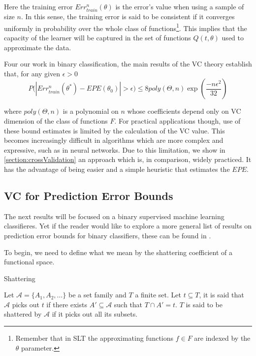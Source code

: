 Here the training error $Err^{n}_{train}(\theta)$ is the error's value when using a sample of size $n$.
In this sense, the training error is said to be consistent if it converges uniformly in probability over the whole class of functions\footnote{Remember that in SLT the approximating functions $f \in F$ are indexed by the $\theta$ parameter.}.
This implies that the capacity of the learner will be captured in the set of functions $Q(t,\theta)$ used to approximate the data.


    Four our work in binary classification, the main results of the VC theory establish that, for any given $\epsilon > 0$
\begin{equation}
P\Bigg(  \left|  Err^n_{train}(\theta^*) - EPE(\theta_0) \right| > \epsilon \Bigg)  \leq 8 poly(\Theta,n) \exp{ \left( {\frac{-n\epsilon^2}{32}} \right)  }
\end{equation}\label{eq:vapnik-binaryBoundProbability}

where $poly(\Theta,n)$ is a polynomial on $n$ whose coefficients depend only on VC dimension of the class of functions $F$.
For practical applications though, use of these bound estimates is limited by the calculation of the VC value.
This becomes increasingly difficult in algorithms which are more complex and expressive, such as in neural networks.
Due to this limitation, we show in \cref{section:crossValidation} an approach which is, in comparison, widely practiced.
It has the advantage of being easier and a simple heuristic that estimates the $EPE$.

\subsection{VC for Prediction Error Bounds }\label{appx:sec:vcErrroBounds}

The next results will be focused on a binary supervised machine learning classifieres. Yet if the reader would like to explore a more general list of results on prediction error bounds for binary classifiers, these can be found in \citep{cherkassky-learning2007}.

To begin, we need to define what we mean by the shattering coefficient of a functional space.

\begin{definition}{Shattering}

Let $\mathcal {A}= \{A_1,A_{2},\dots \}$ be a set family and $T$ a finite set.
Let $t \subseteq T$, it is said that $\mathcal {A}$ picks out $t$ if there exists $A' \subseteq \mathcal {A} $ such that $ T \cap A' = t$.
$T$ is said to be shattered by $\mathcal {A}$ if it picks out all its subsets.


\end{definition}

